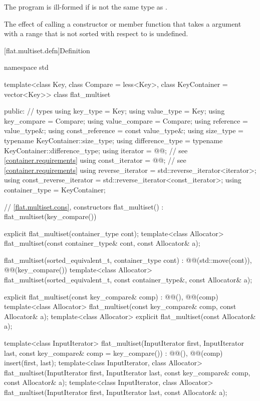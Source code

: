 \pnum
The program is ill-formed if  is not the same type
as .

\pnum
The effect of calling a constructor or member function
that takes a  argument with a range
that is not sorted with respect to  is undefined.

[flat.multiset.defn]{Definition}

\begin{codeblock}
namespace std {
  template<class Key, class Compare = less<Key>, class KeyContainer = vector<Key>>
  class flat_multiset {
  public:
    // types
    using key_type                  = Key;
    using value_type                = Key;
    using key_compare               = Compare;
    using value_compare             = Compare;
    using reference                 = value_type&;
    using const_reference           = const value_type&;
    using size_type                 = typename KeyContainer::size_type;
    using difference_type           = typename KeyContainer::difference_type;
    using iterator                  = @@;  // see \ref{container.requirements}
    using const_iterator            = @@;  // see \ref{container.requirements}
    using reverse_iterator          = std::reverse_iterator<iterator>;
    using const_reverse_iterator    = std::reverse_iterator<const_iterator>;
    using container_type            = KeyContainer;

    // \ref{flat.multiset.cons}, constructors
    flat_multiset() : flat_multiset(key_compare()) { }

    explicit flat_multiset(container_type cont);
    template<class Allocator>
      flat_multiset(const container_type& cont, const Allocator& a);

    flat_multiset(sorted_equivalent_t, container_type cont)
      : @@(std::move(cont)), @@(key_compare()) { }
    template<class Allocator>
      flat_multiset(sorted_equivalent_t, const container_type&, const Allocator& a);

    explicit flat_multiset(const key_compare& comp)
      : @@(), @@(comp) { }
    template<class Allocator>
      flat_multiset(const key_compare& comp, const Allocator& a);
    template<class Allocator>
      explicit flat_multiset(const Allocator& a);

    template<class InputIterator>
      flat_multiset(InputIterator first, InputIterator last,
                    const key_compare& comp = key_compare())
        : @@(), @@(comp)
        { insert(first, last); }
    template<class InputIterator, class Allocator>
      flat_multiset(InputIterator first, InputIterator last,
                    const key_compare& comp, const Allocator& a);
    template<class InputIterator, class Allocator>
      flat_multiset(InputIterator first, InputIterator last, const Allocator& a);

}}
\end{codeblock}
